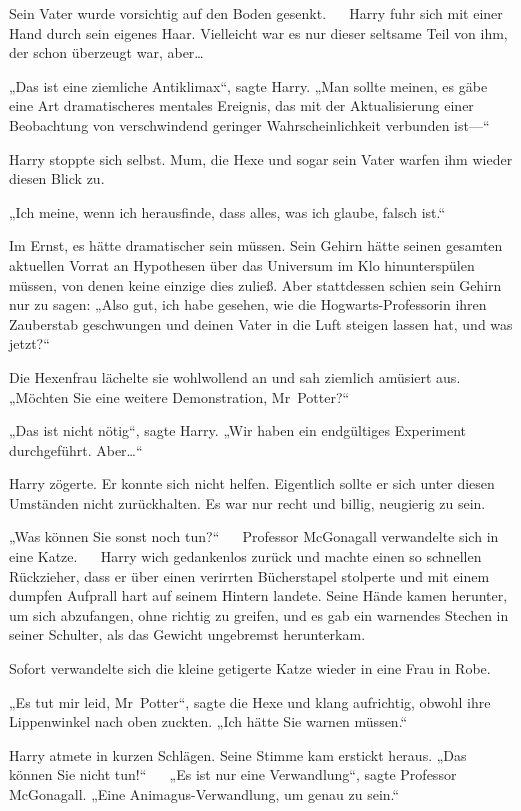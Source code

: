 {Sein Vater wurde vorsichtig auf den Boden gesenkt. ~ ~Harry fuhr sich mit einer Hand durch sein eigenes Haar. Vielleicht war es nur dieser seltsame Teil von ihm, der schon überzeugt war, aber…

„Das ist eine ziemliche Antiklimax“, sagte Harry. „Man sollte meinen, es gäbe eine Art dramatischeres mentales Ereignis, das mit der Aktualisierung einer Beobachtung von verschwindend geringer Wahrscheinlichkeit verbunden ist—“

Harry stoppte sich selbst. Mum, die Hexe und sogar sein Vater warfen ihm wieder diesen Blick zu.

„Ich meine, wenn ich herausfinde, dass alles, was ich glaube, falsch ist.“ ~ ~

Im Ernst, es hätte dramatischer sein müssen. Sein Gehirn hätte seinen gesamten aktuellen Vorrat an Hypothesen über das Universum im Klo hinunterspülen müssen, von denen keine einzige dies zuließ. Aber stattdessen schien sein Gehirn nur zu sagen: „Also gut, ich habe gesehen, wie die Hogwarts-Professorin ihren Zauberstab geschwungen und deinen Vater in die Luft steigen lassen hat, und was jetzt?“ ~ ~

Die Hexenfrau lächelte sie wohlwollend an und sah ziemlich amüsiert aus. „Möchten Sie eine weitere Demonstration, Mr~Potter?“ ~ ~

„Das ist nicht nötig“, sagte Harry. „Wir haben ein endgültiges Experiment durchgeführt. Aber…“

Harry zögerte. Er konnte sich nicht helfen. Eigentlich sollte er sich unter diesen Umständen nicht zurückhalten. Es war nur recht und billig, neugierig zu sein.

„Was können Sie sonst noch tun?“ ~ ~Professor McGonagall verwandelte sich in eine Katze. ~ ~Harry wich gedankenlos zurück und machte einen so schnellen Rückzieher, dass er über einen verirrten Bücherstapel stolperte und mit einem dumpfen Aufprall hart auf seinem Hintern landete. Seine Hände kamen herunter, um sich abzufangen, ohne richtig zu greifen, und es gab ein warnendes Stechen in seiner Schulter, als das Gewicht ungebremst herunterkam. ~ ~

Sofort verwandelte sich die kleine getigerte Katze wieder in eine Frau in Robe.

„Es tut mir leid, Mr~Potter“, sagte die Hexe und klang aufrichtig, obwohl ihre Lippenwinkel nach oben zuckten. „Ich hätte Sie warnen müssen.“ ~ ~

Harry atmete in kurzen Schlägen. Seine Stimme kam erstickt heraus. „Das können Sie nicht tun!“ ~ ~„Es ist nur eine Verwandlung“, sagte Professor McGonagall. „Eine Animagus-Verwandlung, um genau zu sein.“ ~ ~

}
